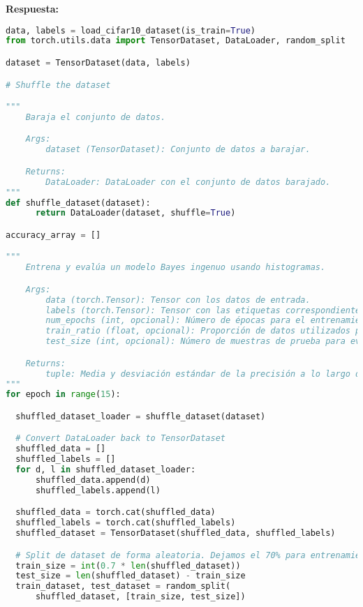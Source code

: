 \documentclass[spanish]{article}
\begin{document}
\vspace{15px}
\par \textbf{Respuesta:}

\begin{lstlisting}[language=Python, caption=Salida Pruba Modelo]
data, labels = load_cifar10_dataset(is_train=True)
from torch.utils.data import TensorDataset, DataLoader, random_split

dataset = TensorDataset(data, labels)

# Shuffle the dataset

"""
    Baraja el conjunto de datos.

    Args:
        dataset (TensorDataset): Conjunto de datos a barajar.

    Returns:
        DataLoader: DataLoader con el conjunto de datos barajado.
"""
def shuffle_dataset(dataset):
      return DataLoader(dataset, shuffle=True)

accuracy_array = []

"""
    Entrena y evalúa un modelo Bayes ingenuo usando histogramas.

    Args:
        data (torch.Tensor): Tensor con los datos de entrada.
        labels (torch.Tensor): Tensor con las etiquetas correspondientes a los datos.
        num_epochs (int, opcional): Número de épocas para el entrenamiento. Por defecto es 15.
        train_ratio (float, opcional): Proporción de datos utilizados para el entrenamiento. Por defecto es 0.7.
        test_size (int, opcional): Número de muestras de prueba para evaluar el modelo. Por defecto es 100.

    Returns:
        tuple: Media y desviación estándar de la precisión a lo largo de las épocas.
"""
for epoch in range(15):

  shuffled_dataset_loader = shuffle_dataset(dataset)

  # Convert DataLoader back to TensorDataset
  shuffled_data = []
  shuffled_labels = []
  for d, l in shuffled_dataset_loader:
      shuffled_data.append(d)
      shuffled_labels.append(l)

  shuffled_data = torch.cat(shuffled_data)
  shuffled_labels = torch.cat(shuffled_labels)
  shuffled_dataset = TensorDataset(shuffled_data, shuffled_labels)

  # Split de dataset de forma aleatoria. Dejamos el 70% para entrenamiento y el 30% para pruebas
  train_size = int(0.7 * len(shuffled_dataset))
  test_size = len(shuffled_dataset) - train_size
  train_dataset, test_dataset = random_split(
      shuffled_dataset, [train_size, test_size])


\end{lstlisting}
\end{document}
